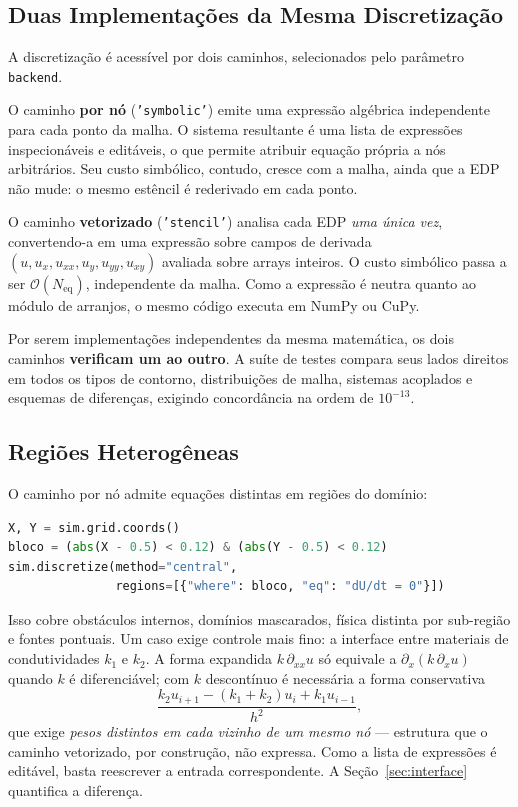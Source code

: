 \documentclass[10pt,brazil,english]{article}
\begin{document}
\subsection{Duas Implementações da Mesma Discretização}
\label{sec:backends}

A discretização é acessível por dois caminhos, selecionados pelo parâmetro \texttt{backend}.

O caminho \textbf{por nó} (\texttt{'symbolic'}) emite uma expressão algébrica independente para cada ponto da malha. O sistema resultante é uma lista de expressões inspecionáveis e editáveis, o que permite atribuir equação própria a nós arbitrários. Seu custo simbólico, contudo, cresce com a malha, ainda que a EDP não mude: o mesmo estêncil é rederivado em cada ponto.

O caminho \textbf{vetorizado} (\texttt{'stencil'}) analisa cada EDP \emph{uma única vez}, convertendo-a em uma expressão sobre campos de derivada $(u, u_x, u_{xx}, u_y, u_{yy}, u_{xy})$ avaliada sobre arrays inteiros. O custo simbólico passa a ser $\mathcal{O}(N_{\text{eq}})$, independente da malha. Como a expressão é neutra quanto ao módulo de arranjos, o mesmo código executa em NumPy ou CuPy.

Por serem implementações independentes da mesma matemática, os dois caminhos \textbf{verificam um ao outro}. A suíte de testes compara seus lados direitos em todos os tipos de contorno, distribuições de malha, sistemas acoplados e esquemas de diferenças, exigindo concordância na ordem de $10^{-13}$.

\subsection{Regiões Heterogêneas}
\label{sec:regioes}

O caminho por nó admite equações distintas em regiões do domínio:

\begin{lstlisting}[float=htb, showstringspaces=false, language=Python]
X, Y = sim.grid.coords()
bloco = (abs(X - 0.5) < 0.12) & (abs(Y - 0.5) < 0.12)
sim.discretize(method="central",
               regions=[{"where": bloco, "eq": "dU/dt = 0"}])
\end{lstlisting}

Isso cobre obstáculos internos, domínios mascarados, física distinta por sub-região e fontes pontuais. Um caso exige controle mais fino: a interface entre materiais de condutividades $k_1$ e $k_2$. A forma expandida $k\,\partial_{xx}u$ só equivale a $\partial_x(k\,\partial_x u)$ quando $k$ é diferenciável; com $k$ descontínuo é necessária a forma conservativa
\begin{equation}
  \frac{k_2 u_{i+1} - (k_1+k_2)u_i + k_1 u_{i-1}}{h^2},
  \label{eq:conservativa}
\end{equation}
que exige \emph{pesos distintos em cada vizinho de um mesmo nó} --- estrutura que o caminho vetorizado, por construção, não expressa. Como a lista de expressões é editável, basta reescrever a entrada correspondente. A Seção~\ref{sec:interface} quantifica a diferença.
\end{document}
